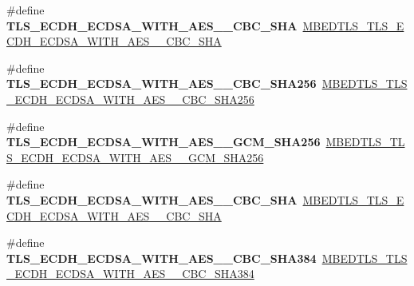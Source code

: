 \begin{DoxyCompactItemize}
\item 
\mbox{\label{compat-1_83_8h_a809a74c346fd5e9b0e614304cadb3e00}} 
\#define {\bfseries T\+L\+S\+\_\+\+E\+C\+D\+H\+\_\+\+E\+C\+D\+S\+A\+\_\+\+W\+I\+T\+H\+\_\+\+A\+E\+S\+\_\+\_\+\+C\+B\+C\+\_\+\+S\+HA}~\mbox{\hyperlink{ssl__ciphersuites_8h_a9d638fe24554ba5c96737ab572f022ac}{M\+B\+E\+D\+T\+L\+S\+\_\+\+T\+L\+S\+\_\+\+E\+C\+D\+H\+\_\+\+E\+C\+D\+S\+A\+\_\+\+W\+I\+T\+H\+\_\+\+A\+E\+S\+\_\+\_\+\+C\+B\+C\+\_\+\+S\+HA}}
\item 
\mbox{\label{compat-1_83_8h_a10f10a84c77909bb5e3d484b3f904a0b}} 
\#define {\bfseries T\+L\+S\+\_\+\+E\+C\+D\+H\+\_\+\+E\+C\+D\+S\+A\+\_\+\+W\+I\+T\+H\+\_\+\+A\+E\+S\+\_\+\_\+\+C\+B\+C\+\_\+\+S\+H\+A256}~\mbox{\hyperlink{ssl__ciphersuites_8h_ac71add892666441d54e693d4e525c73b}{M\+B\+E\+D\+T\+L\+S\+\_\+\+T\+L\+S\+\_\+\+E\+C\+D\+H\+\_\+\+E\+C\+D\+S\+A\+\_\+\+W\+I\+T\+H\+\_\+\+A\+E\+S\+\_\+\_\+\+C\+B\+C\+\_\+\+S\+H\+A256}}
\item 
\mbox{\label{compat-1_83_8h_a26d67663de7dae18c51969bcdc3bd70d}} 
\#define {\bfseries T\+L\+S\+\_\+\+E\+C\+D\+H\+\_\+\+E\+C\+D\+S\+A\+\_\+\+W\+I\+T\+H\+\_\+\+A\+E\+S\+\_\+\_\+\+G\+C\+M\+\_\+\+S\+H\+A256}~\mbox{\hyperlink{ssl__ciphersuites_8h_ae4dd0670307b54f0fc5eb1b82066db22}{M\+B\+E\+D\+T\+L\+S\+\_\+\+T\+L\+S\+\_\+\+E\+C\+D\+H\+\_\+\+E\+C\+D\+S\+A\+\_\+\+W\+I\+T\+H\+\_\+\+A\+E\+S\+\_\+\_\+\+G\+C\+M\+\_\+\+S\+H\+A256}}
\item 
\mbox{\label{compat-1_83_8h_a97381c3874fcdbebe366ff26c3c023fe}} 
\#define {\bfseries T\+L\+S\+\_\+\+E\+C\+D\+H\+\_\+\+E\+C\+D\+S\+A\+\_\+\+W\+I\+T\+H\+\_\+\+A\+E\+S\+\_\+\_\+\+C\+B\+C\+\_\+\+S\+HA}~\mbox{\hyperlink{ssl__ciphersuites_8h_ab731a48b34955555c166402d6be5f166}{M\+B\+E\+D\+T\+L\+S\+\_\+\+T\+L\+S\+\_\+\+E\+C\+D\+H\+\_\+\+E\+C\+D\+S\+A\+\_\+\+W\+I\+T\+H\+\_\+\+A\+E\+S\+\_\+\_\+\+C\+B\+C\+\_\+\+S\+HA}}
\item 
\mbox{\label{compat-1_83_8h_a0f8e1a381e135f77525a9c6393eb924f}} 
\#define {\bfseries T\+L\+S\+\_\+\+E\+C\+D\+H\+\_\+\+E\+C\+D\+S\+A\+\_\+\+W\+I\+T\+H\+\_\+\+A\+E\+S\+\_\+\_\+\+C\+B\+C\+\_\+\+S\+H\+A384}~\mbox{\hyperlink{ssl__ciphersuites_8h_a71a64e94a9d26e95b4a7070a32bc43d4}{M\+B\+E\+D\+T\+L\+S\+\_\+\+T\+L\+S\+\_\+\+E\+C\+D\+H\+\_\+\+E\+C\+D\+S\+A\+\_\+\+W\+I\+T\+H\+\_\+\+A\+E\+S\+\_\+\_\+\+C\+B\+C\+\_\+\+S\+H\+A384}}

\end{DoxyCompactItemize}
